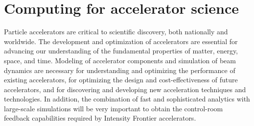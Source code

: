  
\section{Computing for accelerator science}

Particle accelerators are critical to scientific discovery, both nationally and worldwide. The development and optimization of accelerators are essential for advancing our understanding of the fundamental properties of matter, energy, space, and time. Modeling of accelerator components and simulation of beam dynamics are necessary for understanding and optimizing the performance of existing accelerators, for optimizing the design and cost-effectiveness of future accelerators, and for discovering and developing new acceleration techniques and technologies.  In addition, the combination of fast and sophisticated analytics with large-scale simulations will be very important to obtain the control-room feedback capabilities required by Intensity Frontier accelerators.

